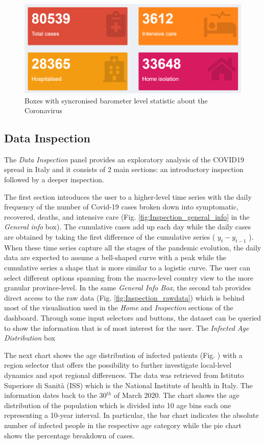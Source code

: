 \documentclass[
12pt, %
a4paper, %
oneside, %
headinclude,footinclude, %
BCOR5mm, %
]{scrartcl}
\begin{document}
\begin{figure}[h]
 \centering
 \includegraphics[width=0.5\linewidth]{Figures/Home_figure_3.png} 
 \caption{Boxes with syncronised barometer level statistic about the Coronavirus}
 \label{Home_fig3}
\end{figure}


\subsection{Data Inspection}\label{Data Inspection}

The \textit{Data Inspection} panel provides an exploratory analysis of the COVID19 spread in Italy and it consists of 2 main sections: an introductory inspection followed by a deeper inspection.

The first section introduces the user to a higher-level time series with the daily frequency of the number of Covid-19 cases broken down into symptomatic, recovered, deaths, and intensive care (Fig. \ref{fig:Inspection_general_info} in the \textit{General info} box). The cumulative cases add up each day while the daily cases are obtained by taking the first difference of the cumulative series ( $y_t - y_{t-1}$ ). When these time series capture all the stages of the pandemic evolution, the daily data are expected to assume a bell-shaped curve with a peak while the cumulative series a shape that is more similar to a logistic curve. The user can select different options spanning from the macro-level country view to the more granular province-level. In the same \textit{General Info Box}, the second tab provides direct access to the raw data (Fig. \ref{fig:Inspection_rawdata}) which is behind most of the visualisation used in the \textit{Home} and \textit{Inspection} sections of the dashboard. Through some input selectors and buttons, the dataset can be queried to show the information that is of most interest for the user.
The \textit{Infected Age Distribution} box 

The next chart shows the age distribution of infected patients (Fig. \cite{fig:Age_distribution}) with a region selector that offers the possibility to further investigate local-level dynamics and spot regional differences. The data was retrieved from Istituto Superiore di Sanità (ISS) \cite{epicentro} which is the National Institute of health in Italy. The information dates back to the 30$^{th}$ of March 2020. The chart shows the age distribution of the population which is divided into 10 age bins each one representing a 10-year interval. In particular, the bar chart indicates the absolute number of infected people in the respective age category while the pie chart shows the percentage breakdown of cases.
\end{document}

